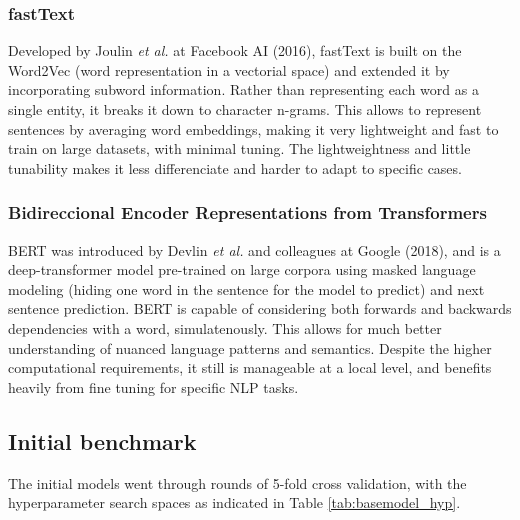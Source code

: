 \documentclass[conference]{IEEEtran}
\begin{document}
\subsubsection{fastText}

Developed by Joulin \textit{et al.} at Facebook AI (2016), fastText is built on the Word2Vec (word representation in a vectorial space) and extended it by incorporating subword information. Rather than representing each word as a single entity, it breaks it down to character n-grams. This allows to represent sentences by averaging word embeddings, making it very lightweight and fast to train on large datasets, with minimal tuning. The lightweightness and little tunability makes it less differenciate and harder to adapt to specific cases.

\subsubsection{Bidireccional Encoder Representations from Transformers}

BERT was introduced by Devlin \textit{et al.} and colleagues at Google (2018), and is a deep-transformer model pre-trained on large corpora using masked language modeling (hiding one word in the sentence for the model to predict) and next sentence prediction. BERT is capable of considering both forwards and backwards dependencies with a word, simulatenously. This allows for much better understanding of nuanced language patterns and semantics. Despite the higher computational requirements, it still is manageable at a local level, and benefits heavily from fine tuning for specific NLP tasks. 






\subsection{Initial benchmark}

The initial models went through rounds of 5-fold cross validation, with the hyperparameter search spaces as indicated in Table \ref{tab:basemodel_hyp}.
\end{document}
